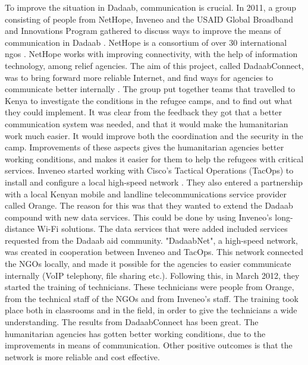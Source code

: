 To improve the situation in Dadaab, communication is crucial. In 2011, a group consisting of people from NetHope, Inveneo and the USAID Global Broadband and Innovations Program gathered to discuss ways to improve the means of communication in Dadaab \cite{dadaab}. NetHope is a consortium of over 30 international \glspl{ngo} \cite{nethope}. NetHope works with improving connectivity, with the help of information technology, among relief agencies. The aim of this project, called DadaabConnect, was to bring forward more reliable Internet, and find ways for agencies to communicate better internally \cite{dadaab}. The group put together teams that travelled to Kenya to investigate the conditions in the refugee camps, and to find out what they could implement. It was clear from the feedback they got that a better communication system was needed, and that it would make the humanitarian work much easier. It would improve both the coordination and the security in the camp. Improvements of these aspects gives the humanitarian agencies better working conditions, and makes it easier for them to help the refugees with critical services. Inveneo started working with Cisco's Tactical Operations (TacOps) to install and configure a local high-speed network \cite{dadaabinveneo}. They also entered a partnership with a local Kenyan mobile and landline telecommunications service provider called Orange. The reason for this was that they wanted to extend the Dadaab compound with new data services. This could be done by using Inveneo's long-distance Wi-Fi solutions. The data services that were added included services requested from the Dadaab aid community. "DadaabNet", a high-speed network, was created in cooperation between Inveneo and TacOps. This network connected the NGOs locally, and made it possible for the agencies to easier communicate internally (VoIP telephony, file sharing etc.). Following this, in March 2012, they started the training of technicians. These technicians were people from Orange, from the technical staff of the NGOs and from Inveneo's staff. The training took place both in classrooms and in the field, in order to give the technicians a wide understanding. The results from DadaabConnect has been great. The humanitarian agencies has gotten better working conditions, due to the improvements in means of communication. Other positive outcomes is that the network is more reliable and cost effective. 

